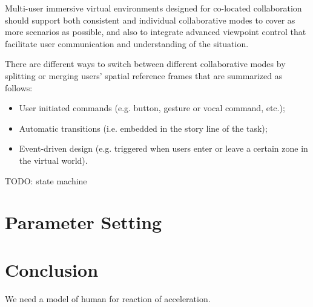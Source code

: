Multi-user immersive virtual environments designed for co-located collaboration should support both consistent and individual collaborative modes to cover as more scenarios as possible, and also to integrate advanced viewpoint control that facilitate user communication and understanding of the situation.

There are different ways to switch between different collaborative modes by splitting or merging users' spatial reference frames that are summarized as follows:

\begin{itemize}
\item User initiated commands (e.g. button, gesture or vocal command, etc.);
\item Automatic transitions (i.e. embedded in the story line of the task);
\item Event-driven design (e.g. triggered when users enter or leave a certain zone in the virtual world).
\end{itemize}


TODO: state machine



\section{Parameter Setting}



\section{Conclusion}
We need a model of human for reaction of acceleration.